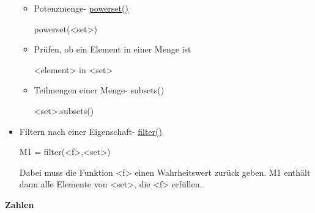 \documentclass[a4paper,9pt,DIV15,twocolumn]{scrartcl}
\begin{document}
\begin{itemize}
\begin{itemize}
 \item Potenzmenge- \href{https://sage.math.uni-goettingen.de/doc/static/reference/sage/misc/misc.html?highlight=powerset#sage.misc.misc.powerset}{powerset()}
\begin{sagein}
powerset(<set>)
\end{sagein}

 \item Prüfen, ob ein Element in einer Menge ist
\begin{sagein}
<element> in <set>
\end{sagein}
\item Teilmengen einer Menge- subsets()
	\begin{sagein}
<set>.subsets()
	\end{sagein}
 \end{itemize}

 \item Filtern nach einer Eigenschaft- \href{https://sage.math.uni-goettingen.de/doc/static/reference/sage/combinat/combinat.html?highlight=filter#sage.combinat.combinat.CombinatorialClass.filter}{filter()}
\begin{sagein}
M1 = filter(<f>,<set>)
\end{sagein}
Dabei muss die Funktion <f> einen Wahrheitswert zurück geben.
M1 enthält dann alle Elemente von <set>, die <f> erfüllen.
\end{itemize}


\textbf{Zahlen}
\end{document}
